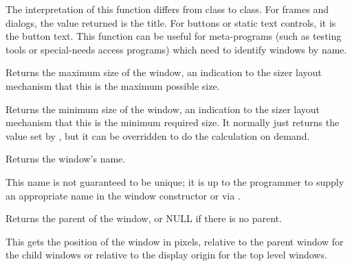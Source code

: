 The interpretation of this function differs from class to class.
For frames and dialogs, the value returned is the title. For buttons or static text controls, it is
the button text. This function can be useful for meta-programs (such as testing
tools or special-needs access programs) which need to identify windows
by name.

\label{wxwindowgetmaxsize}


Returns the maximum size of the window, an indication to the sizer layout mechanism
that this is the maximum possible size. 

\label{wxwindowgetminsize}


Returns the minimum size of the window, an indication to the sizer layout mechanism
that this is the minimum required size. It normally just returns the value set
by , but it can be overridden to do the
calculation on demand.

\label{wxwindowgetname}


Returns the window's name.


This name is not guaranteed to be unique; it is up to the programmer to supply an appropriate
name in the window constructor or via .




\label{wxwindowgetparent}


Returns the parent of the window, or NULL if there is no parent.


\label{wxwindowgetposition}



This gets the position of the window in pixels, relative to the parent window
for the child windows or relative to the display origin for the top level
windows.

